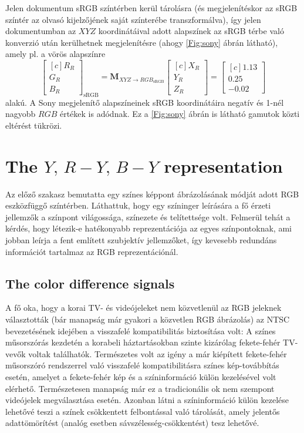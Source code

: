 Jelen dokumentum sRGB színtérben kerül tárolásra (és megjelenítéskor az sRGB színtér az olvasó kijelzőjének saját színterébe transzformálva), így jelen dokumentumban az $XYZ$ koordinátáival adott alapszínek az sRGB térbe való konverzió után kerülhetnek megjelenítésre (ahogy \ref{Fig:sony} ábrán látható), amely pl. a vörös alapszínre
\begin{equation}
\begin{bmatrix}[c]
       R_R \\[0.3em]
       G_R \\[0.3em]
       B_R \end{bmatrix}_{\mathrm{sRGB}}
       =
     \mathbf{M}_{X\!Y\!Z \rightarrow R\!G\!B_{\mathrm{sRGB}}}
      \begin{bmatrix}[c]
       X_R \\[0.3em]
       Y_R \\[0.3em]
       Z_R \end{bmatrix} =      
       \begin{bmatrix}[c]
       1.13 \\[0.3em]
       0.25 \\[0.3em]
       -0.02 \end{bmatrix} 
\end{equation}
alakú.
A Sony megjelenítő alapszíneinek sRGB koordinátáira negatív és 1-nél nagyobb $RGB$ értékek is adódnak.
Ez a \ref{Fig:sony} ábrán is látható gamutok közti eltérést tükrözi.

\section{The $Y,\,R-Y,\,B-Y$ representation}

Az előző szakasz bemutatta egy színes képpont ábrázolásának módját adott RGB eszközfüggő színtérben.
Láthattuk, hogy egy színinger leírására a fő érzeti jellemzők a színpont világossága, színezete és telítettsége volt.
Felmerül tehát a kérdés, hogy létezik-e hatékonyabb reprezentációja az egyes színpontoknak, ami jobban leírja a fent említett szubjektív jellemzőket, így kevesebb redundáns információt tartalmaz az RGB reprezentációnál.

\subsection{The color difference signals}
A fő oka, hogy a korai TV- és videójeleket nem közvetlenül az RGB jeleknek választották (bár manapság már gyakori a közvetlen RGB ábrázolás) az NTSC bevezetésének idejében a visszafelé kompatibilitás biztosítása volt:
A színes műsorszórás kezdetén a korabeli háztartásokban szinte kizárólag fekete-fehér TV-vevők voltak találhatók.
Természetes volt az igény a már kiépített fekete-fehér műsorszóró rendszerrel való visszafelé kompatibilitásra színes kép-továbbítás esetén, amelyet a fekete-fehér kép és a színinformáció külön kezelésével volt elérhető.
Természetesen manapság már ez a tradicionális ok nem szempont videójelek megválasztása esetén.
Azonban látni a színinformáció külön kezelése lehetővé teszi a színek csökkentett felbontással való tárolását, amely jelentős adattömörítést (analóg esetben sávszélesség-csökkentést) tesz lehetővé.

